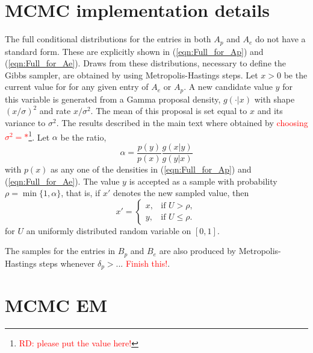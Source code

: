 \documentclass[11pt]{amsart}
\theoremstyle{definition}
\theoremstyle{remark}
\begin{document}
\section{MCMC implementation details}\label{sec:MHsteps}
The full conditional distributions for the entries in both $A_p$ and
$A_e$ do not have a standard form. These are explicitly shown in
(\ref{eqn:Full_for_Ap}) and (\ref{eqn:Full_for_Ae}). Draws from these
distributions, necessary to define the Gibbs sampler,  are obtained by
using Metropolis-Hastings steps.  Let $x > 0$ be the current value for
for any given entry of $A_e$ or $A_p$. A new candidate value $y$ for
this variable is generated from a Gamma proposal density, $g(\cdot|
x)$ with shape $(x/\sigma)^2$ and rate $x/\sigma^2$. The mean of this
proposal is set equal to $x$ and its variance to $\sigma^2$. The 
results  described in the main text where obtained by
\textcolor{red}{choosing 
  $\sigma^2 = *$}\footnote{\textcolor{red}{RD: please put the value
    here!}}. Let $\alpha$ be the ratio,
\[
  \alpha 
 =
  \frac{p(y)}{p(x)} \frac{g(x|y)}{g(y|x)}
\]
with $p(x)$ as any one of the densities in (\ref{eqn:Full_for_Ap}) and 
(\ref{eqn:Full_for_Ae}). The value $y$ is accepted as a sample
with probability $\rho = \min\{1, \alpha\}$, that is, if $x'$ denotes
the new sampled value, then
\[
   x'
    =
  \begin{cases}
    x, & \text{if } U > \rho,\\
    y, & \text{if } U \leq \rho.
  \end{cases}
\]
for $U$ an uniformly distributed random variable on $[0, 1]$.


The samples for the entries in $B_p$ and $B_e$ are also produced by
Metropolis-Hastings steps whenever $\delta_p > ...$
\textcolor{red}{Finish  this!}.

\section{MCMC EM}
\end{document}
